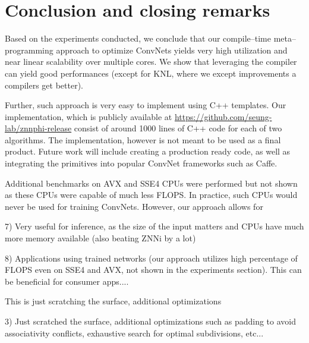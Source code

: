 \section{Conclusion and closing remarks}

  Based on the experiments conducted, we conclude that our
  compile--time meta--programming approach to optimize ConvNets yields
  very high utilization and near linear scalability over multiple
  cores.  We show that leveraging the compiler can yield good
  performances (except for KNL, where we except improvements a
  compilers get better).

  Further, such approach is very easy to implement using C++
  templates.  Our implementation, which is publicly available at
  \url{https://github.com/seung-lab/znnphi-release} consist of around
  1000 lines of C++ code for each of two algorithms.  The
  implementation, however is not meant to be used as a final product.
  Future work will include creating a production ready code, as well
  as integrating the primitives into popular ConvNet frameworks such
  as Caffe.

  Additional benchmarks on AVX and SSE4 CPUs were performed but not
  shown as these CPUs were capable of much less FLOPS.  In practice,
  such CPUs would never be used for training ConvNets.  However, our
  approach allows for


7) Very useful for inference, as the size of the input matters and
CPUs have much more memory available (also beating ZNNi by a lot)

8) Applications using trained networks (our approach utilizes high
percentage of FLOPS even on SSE4 and AVX, not shown in the experiments
section).  This can be beneficial for consumer apps....


  This is just scratching the surface, additional optimizations

3) Just scratched the surface, additional optimizations such as
padding to avoid associativity conflicts, exhaustive search for optimal subdivisions, etc...
